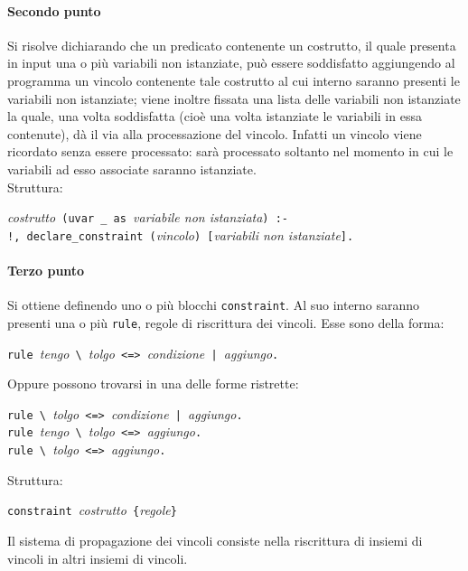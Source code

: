 \documentclass[12pt,a4paper,openright,twoside]{report}
\begin{document}
\paragraph{Secondo punto}
Si risolve dichiarando che un predicato contenente un costrutto, il quale presenta in input una o più variabili non istanziate, può essere soddisfatto aggiungendo al programma un vincolo contenente tale costrutto al cui interno saranno presenti le variabili non istanziate; viene inoltre fissata una lista delle variabili non istanziate la quale, una volta soddisfatta (cioè una volta istanziate le variabili in essa contenute), dà il via alla processazione del vincolo. Infatti un vincolo viene ricordato senza essere processato: sarà processato soltanto nel momento in cui le variabili ad esso associate saranno istanziate.\\
Struttura:
\begin{center}
\textit{costrutto}\verb" (uvar _ as "\textit{variabile non istanziata}\verb") :-"\\
\verb"!, declare_constraint ("\textit{vincolo}\verb") ["\textit{variabili non istanziate}\verb"]."
\end{center}

\paragraph{Terzo punto}
Si ottiene definendo uno o più blocchi \verb"constraint". Al suo interno saranno presenti una o più \verb"rule", regole di riscrittura dei vincoli. Esse sono della forma:
\begin{center}
 \verb"rule "\textit{tengo}\verb" \ "\textit{tolgo}\verb" <=> "\textit{condizione}\verb" | "\textit{aggiungo}\verb"."
\end{center}
Oppure possono trovarsi in una delle forme ristrette:
\begin{center}
 \verb"rule \ "\textit{tolgo}\verb" <=> "\textit{condizione}\verb" | "\textit{aggiungo}\verb"."\\
 \verb"rule "\textit{tengo}\verb" \ "\textit{tolgo}\verb" <=> "\textit{aggiungo}\verb"."\\
 \verb"rule \ "\textit{tolgo}\verb" <=> "\textit{aggiungo}\verb"."\\
\end{center}
Struttura:
\begin{center}
 \verb"constraint "\textit{costrutto}\verb" {"\textit{regole}\verb"}"
\end{center}

Il sistema di propagazione dei vincoli consiste nella riscrittura di insiemi di vincoli in altri insiemi di vincoli.
\end{document}
